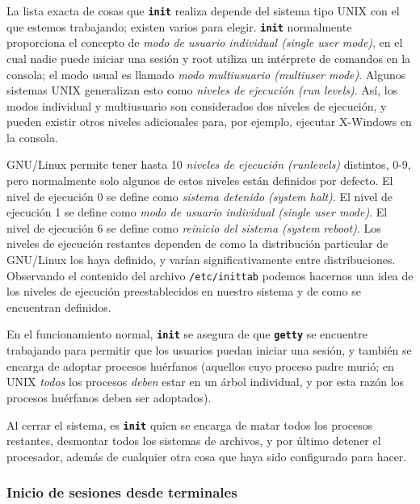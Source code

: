 \documentclass[12pt]{article}
\begin{document}
\begin{}
 La lista exacta de cosas que \texttt{\textbf{init}} realiza depende del sistema tipo UNIX
con el que estemos trabajando; existen varios para elegir. \texttt{\textbf{init}} normalmente
proporciona el concepto de \textit{modo de usuario individual (single user mode)}, en el cual nadie puede
iniciar una sesión y root utiliza un intérprete de comandos en la consola; el
modo usual es llamado \textit{modo multiusuario (multiuser mode)}.
Algunos sistemas UNIX generalizan esto
como \textit{niveles de ejecución (run levels)}. Así, los modos individual y
multiusuario son considerados dos niveles de ejecución, y pueden existir otros
niveles adicionales para, por ejemplo, ejecutar X-Windows en la consola.


 GNU/Linux permite tener hasta 10 \textit{niveles de ejecución (runlevels)} distintos, 0-9,
pero normalmente solo algunos de estos niveles están definidos por defecto. El
nivel de ejecución 0 se define como \textit{sistema detenido (system halt)}. El nivel
de ejecución 1 se define como \textit{modo de usuario individual (single user mode)}.
El nivel de ejecución 6 se define como \textit{reinicio del sistema (system reboot)}.
Los niveles de ejecución restantes dependen de como la distribución particular
de GNU/Linux los haya definido, y varían significativamente entre
distribuciones. Observando el contenido del archivo
\texttt{/etc/inittab} podemos hacernos una idea de los niveles de
ejecución preestablecidos en nuestro sistema y de como se encuentran definidos.


 En el funcionamiento normal, \texttt{\textbf{init}} se asegura de que
\texttt{\textbf{getty}} se encuentre trabajando para permitir que los usuarios puedan iniciar una
sesión, y también se encarga de adoptar procesos huérfanos (aquellos cuyo
proceso padre murió; en UNIX \textit{todos} los procesos \textit{deben} estar
en un árbol individual, y por esta razón los procesos huérfanos deben ser
adoptados).  

 Al cerrar el sistema, es \texttt{\textbf{init}} quien se encarga de
matar todos los procesos restantes, desmontar todos los sistemas de archivos, y
por último detener el procesador, además de cualquier otra cosa que haya sido
configurado para hacer.  




\subsubsection{ Inicio de sesiones desde terminales}


\end{}
\end{document}
